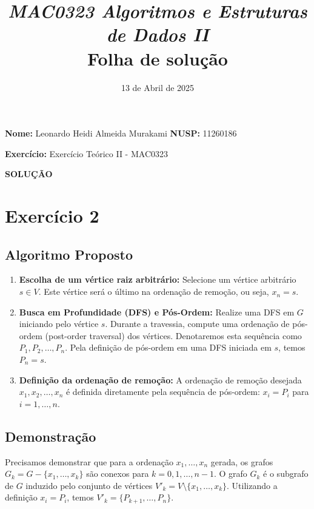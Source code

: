 \documentclass[11pt,reqno,a4paper]{amsart}
\title{\textsl{
    MAC0323 Algoritmos e Estruturas de Dados II}\\\vspace{3\jot}
  Folha de solução}
\author[MAC0323 Folha de solução]{} %
\date{13 de Abril de 2025} %
\theoremstyle{prova_style}
\begin{document}
\parindent=0pt %

\maketitle
\thispagestyle{empty} 
\pagestyle{plain}
\onehalfspace %

\textbf{Nome:} Leonardo Heidi Almeida Murakami\enspace \hfill \enspace
\textbf{NUSP:} 11260186\enspace\hfill

\bigskip

\textbf{Exercício:} Exercício Teórico II - MAC0323\enspace\hfill\enspace

\bigskip
\noindent\textbf{SOLUÇÃO}

\section{Exercício 2}

\subsection{Algoritmo Proposto}

\begin{enumerate}[label=(\arabic*)] 
    \item \textbf{Escolha de um vértice raiz arbitrário:} Selecione um vértice arbitrário $s \in V$. Este vértice será o último na ordenação de remoção, ou seja, $x_n = s$.
    \item \textbf{Busca em Profundidade (DFS) e Pós-Ordem:} Realize uma DFS em $G$ iniciando pelo vértice $s$. Durante a travessia, compute uma ordenação de pós-ordem (post-order traversal) dos vértices. Denotaremos esta sequência como $P_1, P_2, \dots, P_n$. Pela definição de pós-ordem em uma DFS iniciada em $s$, temos $P_n = s$.
    \item \textbf{Definição da ordenação de remoção:} A ordenação de remoção desejada $x_1, x_2, \dots, x_n$ é definida diretamente pela sequência de pós-ordem: $x_i = P_i$ para $i=1, \dots, n$.
\end{enumerate}

\subsection{Demonstração}

Precisamos demonstrar que para a ordenação $x_1, \dots, x_n$ gerada, os grafos $G_k = G - \{x_1, \dots, x_k\}$ são conexos para $k=0, 1, \dots, n-1$. O grafo $G_k$ é o subgrafo de $G$ induzido pelo conjunto de vértices $V'_k = V \setminus \{x_1, \dots, x_k\}$. Utilizando a definição $x_i = P_i$, temos $V'_k = \{P_{k+1}, \dots, P_n\}$.
\end{document}
